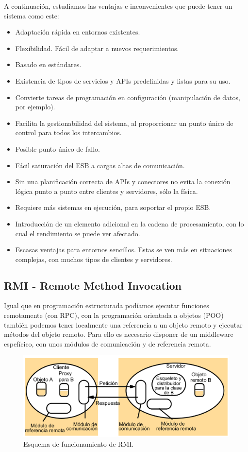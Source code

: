 A continuación, estudiamos las ventajas e inconvenientes que puede tener un sistema como este:
\begin{itemize}
\item Adaptación rápida en entornos existentes.
\item Flexibilidad. Fácil de adaptar a nuevos requerimientos.
\item Basado en estándares.
\item Existencia de tipos de servicios y APIs predefinidas y listas para su uso.
\item Convierte tareas de programación en configuración (manipulación de datos, por ejemplo).
\item Facilita la gestionabilidad del sistema, al proporcionar un punto único de control para todos los intercambios.
\end{itemize}
\begin{itemize}
\item Posible punto único de fallo.
\item Fácil saturación del ESB a cargas altas de comunicación.
\item Sin una planificación correcta de APIs y conectores no evita la conexión lógica punto a punto entre clientes y servidores, sólo la física.
\item Requiere más sistemas en ejecución, para soportar el propio ESB.
\item Introducción de un elemento adicional en la cadena de procesamiento, con lo cual el rendimiento se puede ver afectado.
\item Escasas ventajas para entornos sencillos. Estas se ven más en situaciones complejas, con muchos tipos de clientes y servidores.
\end{itemize}

\subsection{RMI - Remote Method Invocation}

Igual que en programación estructurada podíamos ejecutar funciones remotamente (con RPC), con la programación orientada a objetos (POO) también podemos tener localmente una referencia a un objeto remoto y ejecutar métodos del objeto remoto. Para ello es necesario disponer de un middleware espefícico, con unos módulos de comunicación y de referencia remota.


\begin{figure}[hbtp]
\centering
\includegraphics[width=1\textwidth]{img/RMI.png}
\caption{Esquema de funcionamiento de RMI.}
\label{RMI}
\end{figure}

